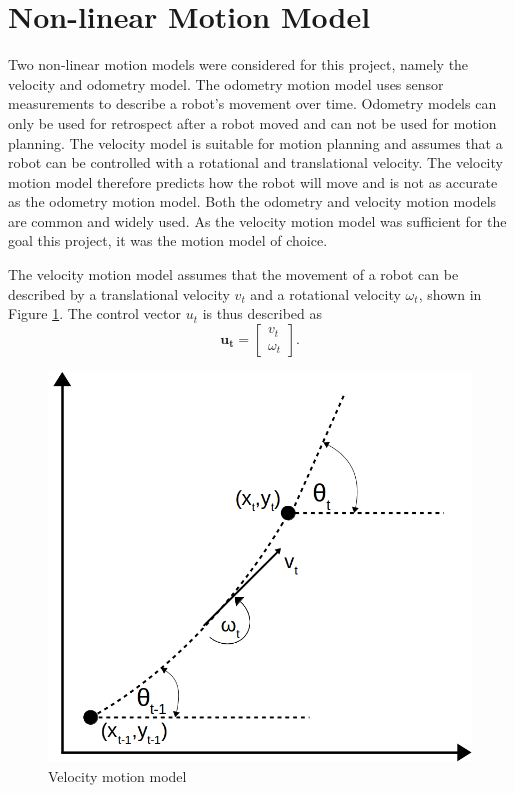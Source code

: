\documentclass[12pt,oneside,openany,a4paper, %
afrikaans,english,
]{memoir}
\numberwithin{equation}{chapter}
\begin{document}
\section{Non-linear Motion Model}\label{vmodel}
Two non-linear motion models were considered for this project, namely the velocity and odometry model. The odometry motion model uses sensor measurements to describe a robot's movement over time. Odometry models can  only be used for retrospect after a robot moved and can not be used for motion planning. The velocity model is suitable for motion planning and assumes that a robot can be controlled with a rotational and translational velocity. The velocity motion model therefore predicts how the robot will move and is not as accurate as the odometry motion model. Both the odometry and velocity motion models are common and widely used. As the velocity motion model was sufficient for the goal this project, it was the motion model of choice.

The velocity motion model assumes that the movement of a robot can be described by a translational velocity $v_t$ and a rotational velocity $\omega_t$, shown in Figure \ref{fig:vel_model}. The control vector $u_t$ is thus described as
\begin{equation}
\bm{u_t} = 
\begin{bmatrix}
v_t\\
\omega_t
\end{bmatrix}.
\end{equation}
\begin{figure}
  \includegraphics[width=0.4\linewidth]{Figures/velocity_model.png}
  \centering
  \caption{Velocity motion model}
  \label{fig:vel_model}
\end{figure}
\end{document}
